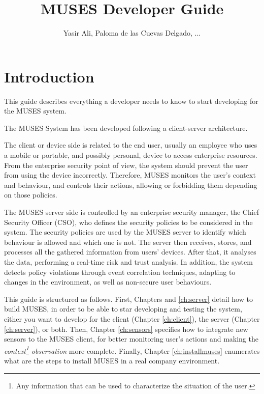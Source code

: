 \documentclass[a4paper,11pt]{book}
\title{MUSES Developer Guide}
\author{Yasir Ali, Paloma de las Cuevas Delgado, ...}
\begin{document}
\maketitle
\tableofcontents

\chapter{Introduction}
\label{ch:intro}

This guide describes everything a developer needs to know to start developing for the MUSES system.

The MUSES System \cite{deliverable21} has been developed following a client-server architecture.
 
The client or device side is related to the end user, usually an employee who uses a mobile or portable, and possibly
personal, device to access enterprise resources. From the enterprise security point of view, the system should prevent the user from using the device incorrectly. Therefore, MUSES monitors the user's context and behaviour, and controls their actions, allowing or forbidding them depending on those policies.

The MUSES server side is controlled by an enterprise security manager, the Chief Security Officer (CSO), who defines the security policies to be considered in the system. The security policies are used by the MUSES server to identify which behaviour is allowed and which one is not. The server then receives, stores, and processes all the gathered information from users' devices. After that, it analyses the data, performing a real-time risk and trust analysis. In addition, the system detects policy violations through event correlation techniques, adapting to changes in the environment, as well as non-secure user behaviours.

This guide is structured as follows. First, Chapters \label{ch:client} and \ref{ch:server} detail how to build MUSES, in order to be able to star developing and testing the system, either you want to develop for the client (Chapter \ref{ch:client}), the server (Chapter \ref{ch:server}), or both. Then, Chapter \ref{ch:sensors} specifies how to integrate new sensors to the MUSES client, for better monitoring user's actions and making the \textit{context\footnote{Any information that can be used to characterize the situation of the user.\cite{deliverable61}} observation} more complete. Finally, Chapter \ref{ch:installmuses} enumerates what are the steps to install MUSES in a real company environment.
\end{document}
